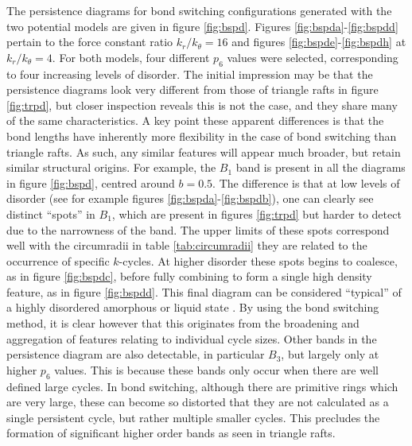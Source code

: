The persistence diagrams for bond switching configurations generated with the two potential models are given in figure \ref{fig:bspd}.
Figures \ref{fig:bspda}\--\ref{fig:bspdd} pertain to the force constant ratio $k_r/k_\theta=16$ and figures \ref{fig:bspde}\--\ref{fig:bspdh} at $k_r/k_\theta=4$.
For both models, four different $p_6$ values were selected, corresponding to four increasing levels of disorder.
The initial impression may be that the persistence diagrams look very different from those of triangle rafts in figure \ref{fig:trpd}, but closer inspection reveals this is not the case, and they share many of the same characteristics.
A key point these apparent differences is that the bond lengths have inherently more flexibility in the case of bond switching than triangle rafts.
As such, any similar features will appear much broader, but retain similar structural origins.
For example, the $B_1$ band is present in all the diagrams in figure \ref{fig:bspd}, centred around $b=0.5$.
The difference is that at low levels of disorder  (see for example figures \ref{fig:bspda}\--\ref{fig:bspdb}), one can clearly see distinct ``spots'' in $B_1$, which are present in figures \ref{fig:trpd} but harder to detect due to the narrowness of the band.
The upper limits of these spots correspond well with the circumradii in table \ref{tab:circumradii} \ie{} they are related to the occurrence of specific $k$\--cycles.
At higher disorder these spots begins to coalesce, as in figure \ref{fig:bspdc}, before fully combining to form a single high density feature, as in figure \ref{fig:bspdd}.
This final diagram can be considered ``typical'' of a highly disordered amorphous or liquid state \cite{Hiraoka2016,Onodera2019}.
By using the bond switching method, it is clear however that this originates from the broadening and aggregation of features relating to individual cycle sizes.
Other bands in the persistence diagram are also detectable, in particular $B_3$, but largely only at higher $p_6$ values. 
This is because these bands only occur when there are well defined large cycles.
In bond switching, although there are primitive rings which are very large, these can become so distorted that they are not calculated as a single persistent cycle, but rather multiple smaller cycles.
This precludes the formation of significant higher order bands as seen in triangle rafts. 

